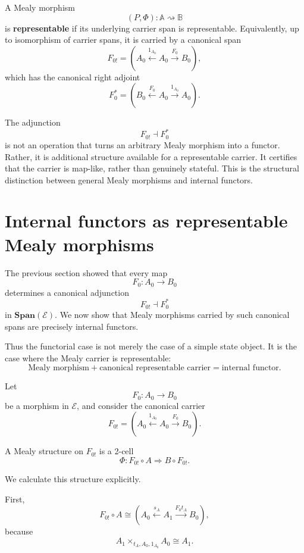 \begin{definition}
\label{def:representable-mealy-morphism}
A Mealy morphism
\[
(P,\Phi):\mathbb A\rightsquigarrow\mathbb B
\]
is \textbf{representable} if its underlying carrier span is representable. Equivalently, up to isomorphism of carrier spans, it is carried by a canonical span
\[
F_{0!}
=
\left(
A_0
\xleftarrow{1_{A_0}}
A_0
\xrightarrow{F_0}
B_0
\right),
\]
which has the canonical right adjoint
\[
F_0^\ast
=
\left(
B_0
\xleftarrow{F_0}
A_0
\xrightarrow{1_{A_0}}
A_0
\right).
\]
\end{definition}

\begin{remark}
\label{rem:adjunction-as-structural-certificate}
The adjunction
\[
F_{0!}\dashv F_0^\ast
\]
is not an operation that turns an arbitrary Mealy morphism into a functor. Rather, it is additional structure available for a representable carrier. It certifies that the carrier is map-like, rather than genuinely stateful. This is the structural distinction between general Mealy morphisms and internal functors.
\end{remark}

\section{Internal functors as representable Mealy morphisms}
\label{sec:internal-functors-left-adjoint-mealy}

The previous section showed that every map
\[
F_0:A_0\to B_0
\]
determines a canonical adjunction
\[
F_{0!}\dashv F_0^\ast
\]
in \(\mathbf{Span}(\mathcal E)\). We now show that Mealy morphisms carried by such canonical spans are precisely internal functors.

Thus the functorial case is not merely the case of a simple state object. It is the case where the Mealy carrier is representable:
\[
\text{Mealy morphism}
+
\text{canonical representable carrier}
=
\text{internal functor}.
\]

Let
\[
F_0:A_0\to B_0
\]
be a morphism in \(\mathcal E\), and consider the canonical carrier
\[
F_{0!}
=
\left(
A_0
\xleftarrow{1_{A_0}}
A_0
\xrightarrow{F_0}
B_0
\right).
\]

A Mealy structure on \(F_{0!}\) is a 2-cell
\[
\Phi:F_{0!}\circ A\Rightarrow B\circ F_{0!}.
\]

We calculate this structure explicitly.

First,
\[
F_{0!}\circ A
\cong
\left(
A_0
\xleftarrow{s_A}
A_1
\xrightarrow{F_0t_A}
B_0
\right),
\]
because
\[
A_1\times_{t_A,A_0,1_{A_0}}A_0\cong A_1.
\]

